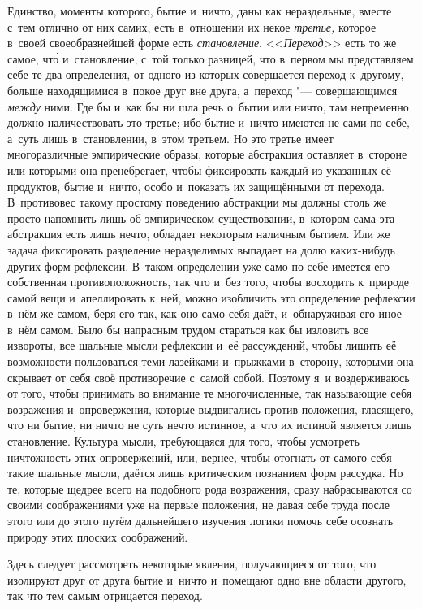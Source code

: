Единство, моменты которого, бытие и~ничто, даны как нераздельные, вместе с~тем
отлично от них самих, есть в~отношении их некое {\em третье,} которое в~своей
своеобразнейшей форме есть {\em становление}. <<{\em Переход}>> есть то же
самое, чт\'{о} и~становление, с~той только разницей, что в~первом мы
представляем себе те два определения, от одного из которых совершается переход
к~другому, больше находящимися в~покое друг вне друга, а~переход "---
совершающимся {\em между} ними. Где бы и~как бы ни шла речь о~бытии или ничто,
там непременно должно наличествовать это третье; ибо бытие и~ничто имеются не
сами по себе, а~суть лишь в~становлении, в~этом третьем. Но это третье имеет
многоразличные эмпирические образы, которые абстракция оставляет в~стороне или
которыми она пренебрегает, чтобы фиксировать каждый из указанных её продуктов,
бытие и~ничто, особо и~показать их защищёнными от перехода. В~противовес такому
простому поведению абстракции мы должны столь же просто напомнить лишь об
эмпирическом существовании, в~котором сама эта абстракция есть лишь нечто,
обладает некоторым наличным бытием. Или же задача фиксировать разделение
неразделимых выпадает на долю каких-нибудь других форм рефлексии. В~таком
определении уже само по себе имеется его собственная противоположность, так что
и~без того, чтобы восходить к~природе самой вещи и~апеллировать к~ней, можно
изобличить это определение рефлексии в~нём же самом, беря его так, как оно само
себя даёт, и~обнаруживая его иное в~нём самом. Было бы напрасным трудом
стараться как бы изловить все извороты, все шальные мысли рефлексии и~её
рассуждений, чтобы лишить её возможности пользоваться теми лазейками и~прыжками
в~сторону, которыми она скрывает от себя своё противоречие с~самой собой.
Поэтому я~и воздерживаюсь от того, чтобы принимать во внимание те
многочисленные, так называющие себя возражения и~опровержения, которые
выдвигались против положения, гласящего, что ни бытие, ни ничто не суть нечто
истинное, а~что их истиной является лишь становление. Культура мысли,
требующаяся для того, чтобы усмотреть ничтожность этих опровержений, или,
вернее, чтобы отогнать от самого себя такие шальные мысли, даётся лишь
критическим познанием форм рассудка. Но те, которые щедрее всего на подобного
рода возражения, сразу набрасываются со своими соображениями уже на первые
положения, не давая себе труда после этого или до этого путём дальнейшего
изучения логики помочь себе осознать природу этих плоских соображений.

Здесь следует рассмотреть некоторые явления, получающиеся от того, что
изолируют друг от друга бытие и~ничто и~помещают одно вне области другого,
так что тем самым отрицается переход.

